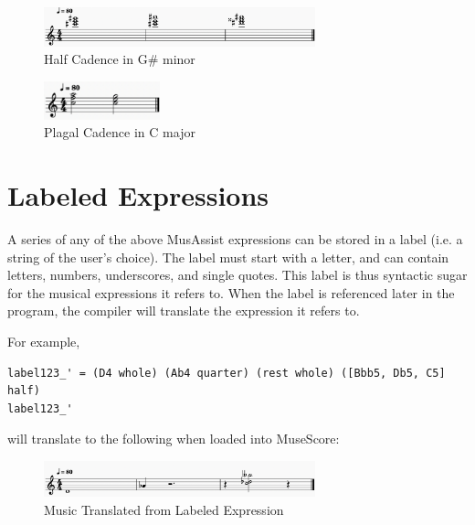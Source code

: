 \documentclass{report}
\begin{document}
\begin{figure}[h!]
\centering
\includegraphics[width=0.7\textwidth]{images/half}
  \caption{Half Cadence in G\# minor}
\end{figure}

\begin{figure}[h!]
\centering
\includegraphics[width=0.3\textwidth]{images/plagal}
  \caption{Plagal Cadence in C major}
\end{figure}


\section{Labeled Expressions}
\label{sec:labels}
A series of any of the above MusAssist expressions can be stored in a label (i.e. a string of the user's choice). The label must start with a letter, and can contain letters, numbers, underscores, and single quotes. This label is thus syntactic sugar for the musical expressions it refers to. When the label is referenced later in the program, the compiler will translate the expression it refers to. 

For example,
\begin{verbatim}
label123_' = (D4 whole) (Ab4 quarter) (rest whole) ([Bbb5, Db5, C5] half) 
label123_'
\end{verbatim}

will translate to the following when loaded into MuseScore:

\begin{figure}[h!]
\centering
\includegraphics[width=0.7\textwidth]{images/label}
  \caption{Music Translated from Labeled Expression}
\end{figure}

\end{document}
